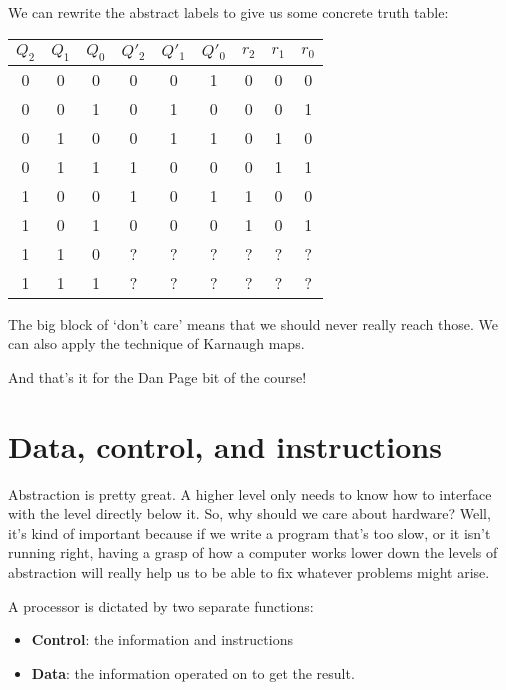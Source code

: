 \documentclass[11pt,a4paper,titlepage,dvipsnames,cmyk]{scrartcl}
\begin{document}
We can rewrite the abstract labels to give us some concrete truth table:
\begin{center}
    \begin{tabular}{|c c c|c c c|c c c|}
        \hline
        $Q_2$ & $Q_1$ & $Q_0$ & $Q'_2$ & $Q'_1$ & $Q'_0$ & $r_2$ & $r_1$ & $r_0$ \\ \hline
        0 & 0 & 0 & 0 & 0 & 1 & 0 & 0 & 0 \\ \hline
        0 & 0 & 1 & 0 & 1 & 0 & 0 & 0 & 1 \\ \hline
        0 & 1 & 0 & 0 & 1 & 1 & 0 & 1 & 0 \\ \hline
        0 & 1 & 1 & 1 & 0 & 0 & 0 & 1 & 1 \\ \hline
        1 & 0 & 0 & 1 & 0 & 1 & 1 & 0 & 0 \\ \hline
        1 & 0 & 1 & 0 & 0 & 0 & 1 & 0 & 1 \\ \hline
        1 & 1 & 0 & ? & ? & ? & ? & ? & ? \\ \hline
        1 & 1 & 1 & ? & ? & ? & ? & ? & ? \\ \hline
    \end{tabular}
\end{center}

The big block of `don't care' means that we should never really reach
those. We can also apply the technique of Karnaugh maps.

And that's it for the Dan Page bit of the course!

\section{Data, control, and instructions}%
\label{sec:Data}

Abstraction is pretty great. A higher level only needs to know how to
interface with the level directly below it. So, why should we care about
hardware? Well, it's kind of important because if we write a program
that's too slow, or it isn't running right, having a grasp of how a
computer works lower down the levels of abstraction will really help us
to be able to fix whatever problems might arise.

A processor is dictated by two separate functions:
\begin{itemize}
    \item \textbf{Control}: the information and instructions
    \item \textbf{Data}: the information operated on to get the result.
\end{itemize}
\end{document}
